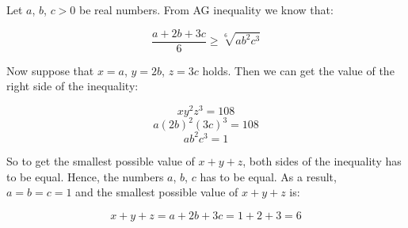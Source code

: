 \documentclass{fkssolpub}
\author{Ondřej Sedláček}
\begin{document}
Let $a$, $b$, $c > 0$ be real numbers. From AG inequality we know that:

\[
	\frac{a + 2b + 3c}{6} \geq \sqrt[6]{ab^2c^3}
\]

Now suppose that $x = a$, $y = 2b$, $z = 3c$ holds. Then we can get the
value of the right side of the inequality:

\[
	xy^2z^3 = 108
\]
\[
	a (2b)^2 (3c)^3 = 108
\]
\[
	ab^2c^3 = 1
\]

So to get the smallest possible value of $x + y + z$, both sides of the inequality
has to be equal. Hence, the numbers $a$, $b$, $c$ has to be equal. As a result,
$a = b = c = 1$ and the smallest possible value of $x + y + z$ is:

\[
	x + y + z = a + 2b + 3c = 1 + 2 + 3 = 6
\]
\end{document}
